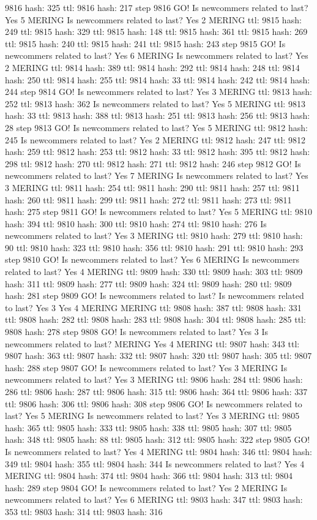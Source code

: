 9816 hash: 325 ttl: 9816 hash: 217 step 9816 GO! Is newcommers related to last? Yes 5 MERING Is newcommers related to last? Yes 2 MERING ttl: 9815 hash: 249 ttl: 9815 hash: 329 ttl: 9815 hash: 148 ttl: 9815 hash: 361 ttl: 9815 hash: 269 ttl: 9815 hash: 240 ttl: 9815 hash: 241 ttl: 9815 hash: 243 step 9815 GO! Is newcommers related to last? Yes 6 MERING Is newcommers related to last? Yes 2 MERING ttl: 9814 hash: 389 ttl: 9814 hash: 292 ttl: 9814 hash: 248 ttl: 9814 hash: 250 ttl: 9814 hash: 255 ttl: 9814 hash: 33 ttl: 9814 hash: 242 ttl: 9814 hash: 244 step 9814 GO! Is newcommers related to last? Yes 3 MERING ttl: 9813 hash: 252 ttl: 9813 hash: 362 Is newcommers related to last? Yes 5 MERING ttl: 9813 hash: 33 ttl: 9813 hash: 388 ttl: 9813 hash: 251 ttl: 9813 hash: 256 ttl: 9813 hash: 28 step 9813 GO! Is newcommers related to last? Yes 5 MERING ttl: 9812 hash: 245 Is newcommers related to last? Yes 2 MERING ttl: 9812 hash: 247 ttl: 9812 hash: 259 ttl: 9812 hash: 253 ttl: 9812 hash: 33 ttl: 9812 hash: 395 ttl: 9812 hash: 298 ttl: 9812 hash: 270 ttl: 9812 hash: 271 ttl: 9812 hash: 246 step 9812 GO! Is newcommers related to last? Yes 7 MERING Is newcommers related to last? Yes 3 MERING ttl: 9811 hash: 254 ttl: 9811 hash: 290 ttl: 9811 hash: 257 ttl: 9811 hash: 260 ttl: 9811 hash: 299 ttl: 9811 hash: 272 ttl: 9811 hash: 273 ttl: 9811 hash: 275 step 9811 GO! Is newcommers related to last? Yes 5 MERING ttl: 9810 hash: 394 ttl: 9810 hash: 300 ttl: 9810 hash: 274 ttl: 9810 hash: 276 Is newcommers related to last? Yes 3 MERING ttl: 9810 hash: 279 ttl: 9810 hash: 90 ttl: 9810 hash: 323 ttl: 9810 hash: 356 ttl: 9810 hash: 291 ttl: 9810 hash: 293 step 9810 GO! Is newcommers related to last? Yes 6 MERING Is newcommers related to last? Yes 4 MERING ttl: 9809 hash: 330 ttl: 9809 hash: 303 ttl: 9809 hash: 311 ttl: 9809 hash: 277 ttl: 9809 hash: 324 ttl: 9809 hash: 280 ttl: 9809 hash: 281 step 9809 GO! Is newcommers related to last? Is newcommers related to last? Yes 3 Yes 4 MERING MERING ttl: 9808 hash: 387 ttl: 9808 hash: 331 ttl: 9808 hash: 282 ttl: 9808 hash: 283 ttl: 9808 hash: 304 ttl: 9808 hash: 285 ttl: 9808 hash: 278 step 9808 GO! Is newcommers related to last? Yes 3 Is newcommers related to last? MERING Yes 4 MERING ttl: 9807 hash: 343 ttl: 9807 hash: 363 ttl: 9807 hash: 332 ttl: 9807 hash: 320 ttl: 9807 hash: 305 ttl: 9807 hash: 288 step 9807 GO! Is newcommers related to last? Yes 3 MERING Is newcommers related to last? Yes 3 MERING ttl: 9806 hash: 284 ttl: 9806 hash: 286 ttl: 9806 hash: 287 ttl: 9806 hash: 315 ttl: 9806 hash: 364 ttl: 9806 hash: 337 ttl: 9806 hash: 306 ttl: 9806 hash: 308 step 9806 GO! Is newcommers related to last? Yes 5 MERING Is newcommers related to last? Yes 3 MERING ttl: 9805 hash: 365 ttl: 9805 hash: 333 ttl: 9805 hash: 338 ttl: 9805 hash: 307 ttl: 9805 hash: 348 ttl: 9805 hash: 88 ttl: 9805 hash: 312 ttl: 9805 hash: 322 step 9805 GO! Is newcommers related to last? Yes 4 MERING ttl: 9804 hash: 346 ttl: 9804 hash: 349 ttl: 9804 hash: 355 ttl: 9804 hash: 344 Is newcommers related to last? Yes 4 MERING ttl: 9804 hash: 374 ttl: 9804 hash: 366 ttl: 9804 hash: 313 ttl: 9804 hash: 289 step 9804 GO! Is newcommers related to last? Yes 2 MERING Is newcommers related to last? Yes 6 MERING ttl: 9803 hash: 347 ttl: 9803 hash: 353 ttl: 9803 hash: 314 ttl: 9803 hash: 316 